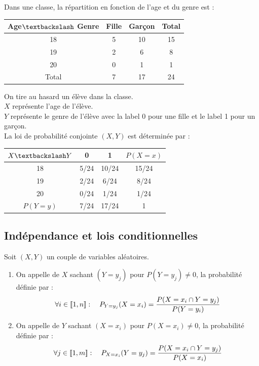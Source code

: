 \documentclass{book}
\begin{document}
\begin{Exemple}
Dans une classe, la répartition en fonction de l'age et du genre est :
\begin{center}
\begin{tabular}{|c|c|c|c|}
\hline
Age$\textbackslash$ Genre & Fille& Garçon & Total\\\hline
18 & 5 & 10& 15 \\\hline
19 & 2 & 6& 8 \\\hline
20 & 0 & 1 & 1 \\\hline
Total&7&17&24 \\\hline
\end{tabular}
\end{center}
On tire au hasard un élève dans la classe.\\
$X$ représente l'age de l'élève.\\
$Y$ représente le genre de l'élève avec la label 0 pour une fille et le label 1 pour un garçon.\\
La loi de probabilité conjointe $(X,Y)$ est déterminée par :
 \begin{center}
\begin{tabular}{|c|c|c|c|}
\hline
$X\textbackslash Y$ & 0& 1 & $P(X=x)$\\\hline
18 & 5/24& 10/24 & 15/24\\\hline
19 & 2/24& 6/24 & 8/24\\\hline
20 & 0/24& 1/24 & 1/24\\\hline
$P(Y=y)$&7/24&17/24&1 \\\hline
\end{tabular}
\end{center} 

\end{Exemple}

\subsection{Indépendance et lois conditionnelles}
\begin{DefinitionProposition}
Soit $(X,Y)$ un couple de variables aléatoires.\\
\begin{enumerate}
\item On appelle  de $X$ sachant $(Y = y_j )$ pour $P(Y = y_j )\neq 0$, la probabilité définie par  :
$$\forall i\in \mathopen\lbrack\!\lbrack1,n \mathclose\rbrack\!\rbrack:\quad  P_{Y=y_j}(X=x_i)=\frac{P(X=x_i\cap Y=y_j) } {P(Y=y_i)}$$ 
\item On appelle  de $Y$ sachant $(X = x_i )$ pour $P(X = x_i )\neq 0$, la probabilité définie par  :
$$\forall j\in \mathopen\lbrack\!\lbrack1,m \mathclose\rbrack\!\rbrack:\quad  P_{X=x_i}(Y=y_j)=\frac{P(X=x_i\cap Y=y_j) } {P(X=x_i)}$$ 
\end{enumerate}
\end{DefinitionProposition}
\end{document}
